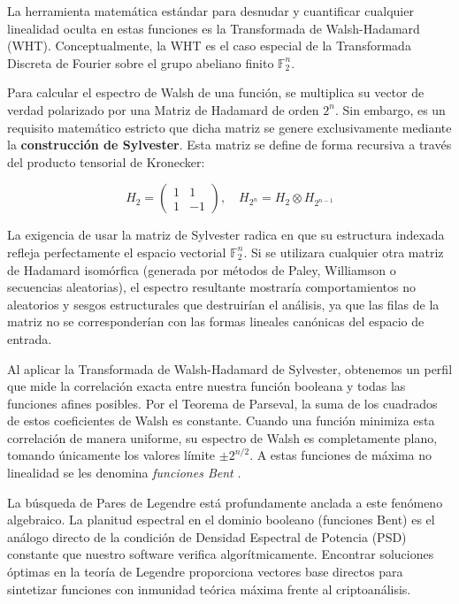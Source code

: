 \documentclass[12pt,a4paper]{tfg_domingo}
\begin{document}
La herramienta matemática estándar para desnudar y cuantificar cualquier linealidad oculta en estas funciones es la Transformada de Walsh-Hadamard (WHT). Conceptualmente, la WHT es el caso especial de la Transformada Discreta de Fourier sobre el grupo abeliano finito $\mathbb{F}_2^n$.

Para calcular el espectro de Walsh de una función, se multiplica su vector de verdad polarizado por una Matriz de Hadamard de orden $2^n$. Sin embargo, es un requisito matemático estricto que dicha matriz se genere exclusivamente mediante la \textbf{construcción de Sylvester}. Esta matriz se define de forma recursiva a través del producto tensorial de Kronecker:

$$ H_2 = \begin{pmatrix} 1 & 1 \\ 1 & -1 \end{pmatrix}, \quad H_{2^n} = H_2 \otimes H_{2^{n-1}} $$

La exigencia de usar la matriz de Sylvester radica en que su estructura indexada refleja perfectamente el espacio vectorial $\mathbb{F}_2^n$. Si se utilizara cualquier otra matriz de Hadamard isomórfica (generada por métodos de Paley, Williamson o secuencias aleatorias), el espectro resultante mostraría comportamientos no aleatorios y sesgos estructurales que destruirían el análisis, ya que las filas de la matriz no se corresponderían con las formas lineales canónicas del espacio de entrada.

Al aplicar la Transformada de Walsh-Hadamard de Sylvester, obtenemos un perfil que mide la correlación exacta entre nuestra función booleana y todas las funciones afines posibles. Por el Teorema de Parseval, la suma de los cuadrados de estos coeficientes de Walsh es constante. Cuando una función minimiza esta correlación de manera uniforme, su espectro de Walsh es completamente plano, tomando únicamente los valores límite $\pm 2^{n/2}$. A estas funciones de máxima no linealidad se les denomina \emph{funciones Bent} \cite{rothaus1976bent, pommerening2014fourier}.

La búsqueda de Pares de Legendre está profundamente anclada a este fenómeno algebraico. La planitud espectral en el dominio booleano (funciones Bent) es el análogo directo de la condición de Densidad Espectral de Potencia (PSD) constante que nuestro software verifica algorítmicamente. Encontrar soluciones óptimas en la teoría de Legendre proporciona vectores base directos para sintetizar funciones con inmunidad teórica máxima frente al criptoanálisis.
\end{document}
